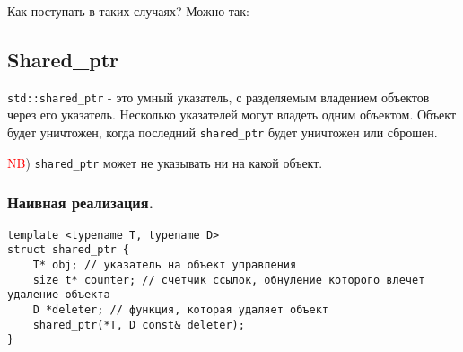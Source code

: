 \documentclass[12pt]{article}
\begin{document}
Как поступать в таких случаях? Можно так:

\subsection{Shared\_ptr}
\texttt{std::shared_ptr} - это умный указатель, с разделяемым владением объектов через его указатель. Несколько указателей могут владеть одним объектом. Объект будет уничтожен, когда последний \texttt{shared_ptr} будет уничтожен или сброшен.

\textcolor{red}{NB}) \texttt{shared_ptr} может не указывать ни на какой объект.

\subsubsection{Наивная реализация.}

\begin{verbatim}
template <typename T, typename D>
struct shared_ptr {
    T* obj; // указатель на объект управления
    size_t* counter; // счетчик ссылок, обнуление которого влечет удаление объекта
    D *deleter; // функция, которая удаляет объект
    shared_ptr(*T, D const& deleter);
}

\end{verbatim}
\end{document}
